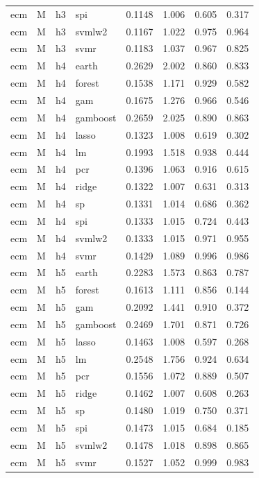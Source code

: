 \begin{ThreePartTable}
\begin{longtable}[t]{llclcccc}
ecm & M & h3 & spi & 0.1148 & 1.006 & 0.605 & 0.317\\
ecm & M & h3 & svmlw2 & 0.1167 & 1.022 & 0.975 & 0.964\\
ecm & M & h3 & svmr & 0.1183 & 1.037 & 0.967 & 0.825\\
\addlinespace
ecm & M & h4 & earth & 0.2629 & 2.002 & 0.860 & 0.833\\
ecm & M & h4 & forest & 0.1538 & 1.171 & 0.929 & 0.582\\
ecm & M & h4 & gam & 0.1675 & 1.276 & 0.966 & 0.546\\
ecm & M & h4 & gamboost & 0.2659 & 2.025 & 0.890 & 0.863\\
ecm & M & h4 & lasso & 0.1323 & 1.008 & 0.619 & 0.302\\
ecm & M & h4 & lm & 0.1993 & 1.518 & 0.938 & 0.444\\
ecm & M & h4 & pcr & 0.1396 & 1.063 & 0.916 & 0.615\\
ecm & M & h4 & ridge & 0.1322 & 1.007 & 0.631 & 0.313\\
ecm & M & h4 & sp & 0.1331 & 1.014 & 0.686 & 0.362\\
ecm & M & h4 & spi & 0.1333 & 1.015 & 0.724 & 0.443\\
ecm & M & h4 & svmlw2 & 0.1333 & 1.015 & 0.971 & 0.955\\
ecm & M & h4 & svmr & 0.1429 & 1.089 & 0.996 & 0.986\\
\addlinespace
ecm & M & h5 & earth & 0.2283 & 1.573 & 0.863 & 0.787\\
ecm & M & h5 & forest & 0.1613 & 1.111 & 0.856 & 0.144\\
ecm & M & h5 & gam & 0.2092 & 1.441 & 0.910 & 0.372\\
ecm & M & h5 & gamboost & 0.2469 & 1.701 & 0.871 & 0.726\\
ecm & M & h5 & lasso & 0.1463 & 1.008 & 0.597 & 0.268\\
ecm & M & h5 & lm & 0.2548 & 1.756 & 0.924 & 0.634\\
ecm & M & h5 & pcr & 0.1556 & 1.072 & 0.889 & 0.507\\
ecm & M & h5 & ridge & 0.1462 & 1.007 & 0.608 & 0.263\\
ecm & M & h5 & sp & 0.1480 & 1.019 & 0.750 & 0.371\\
ecm & M & h5 & spi & 0.1473 & 1.015 & 0.684 & 0.185\\
ecm & M & h5 & svmlw2 & 0.1478 & 1.018 & 0.898 & 0.865\\
ecm & M & h5 & svmr & 0.1527 & 1.052 & 0.999 & 0.983\\

\end{longtable}
\end{ThreePartTable}
